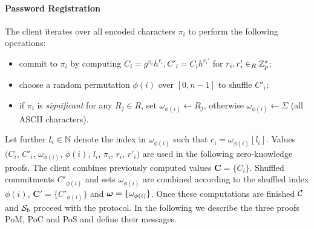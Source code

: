\paragraph{Password Registration}
The client iterates over all encoded characters $\pi_i$ to perform the following operations:
\begin{itemize}
  \item commit to $\pi_i$ by computing $C_i=g^{\pi_i}h^{r_i}, C'_i=C_i h^{r_i'}$ for $r_i,r'_i\in_R\mathbb{Z}^\ast_p$;
  \item choose a random permutation $\phi(i)$ over $[0,n-1]$ to shuffle $C'_i$;
  \item if $\pi_i$ is \emph{significant} for any $R_j\in R$, set $\omega_{\phi(i)}\gets R_j$, otherwise $\omega_{\phi(i)}\gets\Sigma$ (all \ac{ASCII} characters).
\end{itemize}
Let further $l_i\in\mathbb{N}$ denote the index in $\omega_{\phi(i)}$ such that $c_i=\omega_{\phi(i)}[l_i]$.
Values $(C_i$, $C'_i$, $\omega_{\phi(i)}$, $\phi(i)$, $l_i$, $\pi_i$, $r_i$, $r'_i)$ are used in the following zero-knowledge proofs.
The client combines previously computed values $\bm C = \{C_{i}\}$.
Shuffled commitments $C'_{\phi(i)}$ and sets $\omega_{\phi(i)}$ are combined according to the shuffled index $\phi(i)$, \ie $\bm C' = \{C'_{\phi(i)}\}$ and $\boldsymbol{\mathbf{\omega}} = \{\omega_{\phi(i)}\}$.
Once these computations are finished $\mathcal{C}$ and $\mathcal{S}_b$ proceed with the protocol.
In the following we describe the three proofs \ac{PoM}, \ac{PoC} and \ac{PoS} and define their messages.


